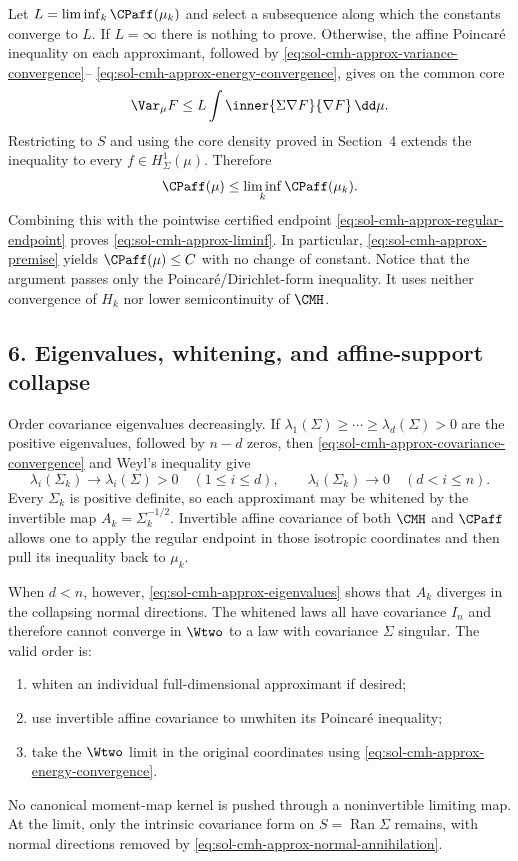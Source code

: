 \documentclass[../main.tex]{subfiles}
\begin{document}
Let $L=\liminf_k\CPaff(\mu_k)$ and select a subsequence along which the constants converge to
$L$.  If $L=\infty$ there is nothing to prove.  Otherwise, the affine Poincar\'e inequality on
each approximant, followed by
\eqref{eq:sol-cmh-approx-variance-convergence}--
\eqref{eq:sol-cmh-approx-energy-convergence}, gives on the common core
\[
  \Var_\mu F
  \le L\int\inner{\Sigma\nabla F}{\nabla F}\,\dd\mu.
\]
Restricting to $S$ and using the core density proved in Section~4 extends the inequality to
every $f\in H^1_\Sigma(\mu)$.  Therefore
\[
  \CPaff(\mu)\le\liminf_k\CPaff(\mu_k).
\]
Combining this with the pointwise certified endpoint
\eqref{eq:sol-cmh-approx-regular-endpoint} proves
\eqref{eq:sol-cmh-approx-liminf}.  In particular,
\eqref{eq:sol-cmh-approx-premise} yields $\CPaff(\mu)\le C$ with no change of constant.  Notice
that the argument passes only the Poincar\'e/Dirichlet-form inequality.  It uses neither
convergence of $H_k$ nor lower semicontinuity of $\CMH$.

\subsection*{6. Eigenvalues, whitening, and affine-support collapse}

Order covariance eigenvalues decreasingly.  If
$\lambda_1(\Sigma)\ge\cdots\ge\lambda_d(\Sigma)>0$ are the positive eigenvalues, followed by
$n-d$ zeros, then \eqref{eq:sol-cmh-approx-covariance-convergence} and Weyl's inequality give
\begin{equation}
  \lambda_i(\Sigma_k)\longrightarrow\lambda_i(\Sigma)>0
       \quad(1\le i\le d),
  \qquad
  \lambda_i(\Sigma_k)\longrightarrow0
       \quad(d<i\le n).
  \label{eq:sol-cmh-approx-eigenvalues}
\end{equation}
Every $\Sigma_k$ is positive definite, so each approximant may be whitened by the invertible
map $A_k=\Sigma_k^{-1/2}$.  Invertible affine covariance of both $\CMH$ and $\CPaff$ allows one
to apply the regular endpoint in those isotropic coordinates and then pull its inequality back
to $\mu_k$.

When $d<n$, however, \eqref{eq:sol-cmh-approx-eigenvalues} shows that $A_k$ diverges in the
collapsing normal directions.  The whitened laws all have covariance $I_n$ and therefore cannot
converge in $\Wtwo$ to a law with covariance $\Sigma$ singular.  The valid order is:
\begin{enumerate}[label=(\arabic*),leftmargin=2.2em]
  \item whiten an individual full-dimensional approximant if desired;
  \item use invertible affine covariance to unwhiten its Poincar\'e inequality;
  \item take the $\Wtwo$ limit in the original coordinates using
        \eqref{eq:sol-cmh-approx-energy-convergence}.
\end{enumerate}
No canonical moment-map kernel is pushed through a noninvertible limiting map.  At the limit,
only the intrinsic covariance form on $S=\operatorname{Ran}\Sigma$ remains, with normal
directions removed by \eqref{eq:sol-cmh-approx-normal-annihilation}.
\end{document}
